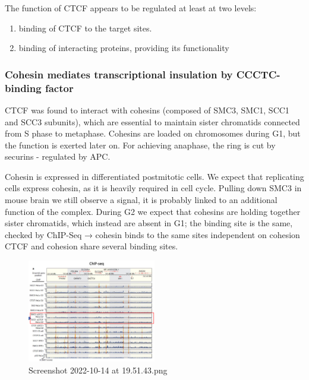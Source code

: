 The function of CTCF appears to be regulated at least at two levels:

\begin{enumerate}
\def\labelenumi{\arabic{enumi}.}
\tightlist
\item
  binding of CTCF to the target sites.
\item
  binding of interacting proteins, providing its functionality
\end{enumerate}

\hypertarget{cohesin-mediates-transcriptional-insulation-by-ccctc-binding-factor}{%
\subsubsection{Cohesin mediates transcriptional insulation by CCCTC-binding factor}\label{cohesin-mediates-transcriptional-insulation-by-ccctc-binding-factor}}

CTCF was found to interact with cohesins (composed of SMC3, SMC1, SCC1 and SCC3 subunits), which are essential to maintain sister chromatids connected from S phase to metaphase. Cohesins are loaded on chromosomes during G1, but the function is exerted later on. For achieving anaphase, the ring is cut by securins - regulated by APC.

Cohesin is expressed in differentiated postmitotic cells. We expect that replicating cells express cohesin, as it is heavily required in cell cycle. Pulling down SMC3 in mouse brain we still observe a signal, it is probably linked to an additional function of the complex. During G2 we expect that cohesins are holding together sister chromatids, which instead are absent in G1; the binding site is the same, checked by ChIP-Seq → cohesin binds to the same sites independent on cohesion CTCF and cohesion share several binding sites.

\begin{figure}
\centering
\includegraphics[width=0.5\textwidth]{../_resources/Screenshot_2022-10-14_at_19-51-43.png}
\caption{Screenshot 2022-10-14 at 19.51.43.png}
\end{figure}

